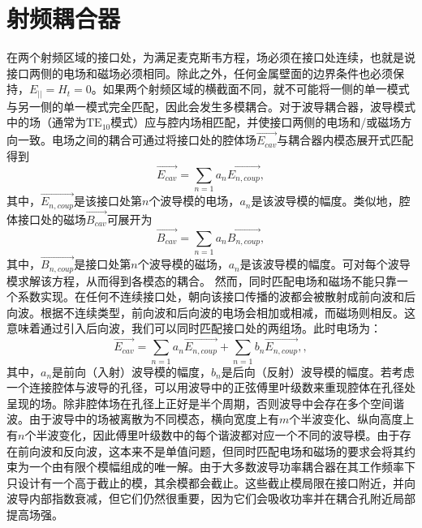 \documentclass{cernyrep}
\begin{document}
\section{射频耦合器}
在两个射频区域的接口处，为满足麦克斯韦方程，场必须在接口处连续，也就是说接口两侧的电场和磁场必须相同。除此之外，任何金属壁面的边界条件也必须保持，$E_{||}=H_t=0$。如果两个射频区域的横截面不同，就不可能将一侧的单一模式与另一侧的单一模式完全匹配，因此会发生多模耦合。对于波导耦合器，波导模式中的场（通常为$\textrm{TE}_{10}$模式）应与腔内场相匹配，并使接口两侧的电场和/或磁场方向一致。电场之间的耦合可通过将接口处的腔体场$\vec{E_{cav}}$与耦合器内模态展开式匹配得到
\begin{equation}
    \vec{E_{cav}}= \sum_{n=1}{a_n \vec{E_{n,coup}}},
\end{equation}
其中，$\vec{E_{n,coup}}$是该接口处第$n$个波导模的电场，$a_n$是该波导模的幅度。类似地，腔体接口处的磁场$\vec{B_{cav}}$可展开为
\begin{equation}
    \vec{B_{cav}}= \sum_{n=1}{a_n \vec{B_{n,coup}}},
\end{equation}
其中，$\vec{B_{n, coup}}$是接口处第$n$个波导模的磁场，$a_n$是该波导模的幅度。可对每个波导模求解该方程，从而得到各模态的耦合。
然而，同时匹配电场和磁场不能只靠一个系数实现。在任何不连续接口处，朝向该接口传播的波都会被散射成前向波和后向波。根据不连续类型，前向波和后向波的电场会相加或相减，而磁场则相反。这意味着通过引入后向波，我们可以同时匹配接口处的两组场。此时电场为：
\begin{equation}
    \vec{E_{cav}}= \sum_{n=1}{a_n \vec{E_{n,coup}}} + \sum_{n=1}{b_n \vec{E_{n,coup}}},,
\end{equation}
其中，$a_n$是前向（入射）波导模的幅度，$b_n$是后向（反射）波导模的幅度。若考虑一个连接腔体与波导的孔径，可以用波导中的正弦傅里叶级数来重现腔体在孔径处呈现的场。除非腔体场在孔径上正好是半个周期，否则波导中会存在多个空间谐波。由于波导中的场被离散为不同模态，横向宽度上有$m$个半波变化、纵向高度上有$n$个半波变化，因此傅里叶级数中的每个谐波都对应一个不同的波导模。由于存在前向波和反向波，这本来不是单值问题，但同时匹配电场和磁场的要求会将其约束为一个由有限个模幅组成的唯一解。由于大多数波导功率耦合器在其工作频率下只设计有一个高于截止的模，其余模都会截止。这些截止模局限在接口附近，并向波导内部指数衰减，但它们仍然很重要，因为它们会吸收功率并在耦合孔附近局部提高场强。
\end{document}
